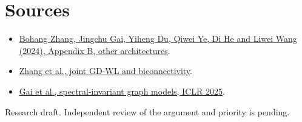 \documentclass[10pt]{article}
\begin{document}
\section*{Sources}
\begin{itemize}
\item \href{https://arxiv.org/abs/2401.08514}{Bohang Zhang, Jingchu Gai, Yiheng Du, Qiwei Ye, Di He and Liwei Wang (2024), Appendix B, other architectures}.
\item \href{https://arxiv.org/abs/2301.09505}{Zhang et al., joint GD-WL and biconnectivity}.
\item \href{https://proceedings.iclr.cc/paper_files/paper/2025/hash/6b7f9d9c1217a748391800871ff7d17d-Abstract-Conference.html}{Gai et al., spectral-invariant graph models, ICLR 2025}.
\end{itemize}
{\small Research draft. Independent review of the argument and priority is pending.}
\end{document}
